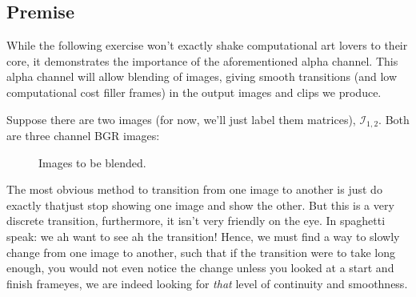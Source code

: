\documentclass[a4paper]{article}
\begin{document}
\subsection{Premise}
While the following exercise won't exactly shake computational art lovers to their core, it demonstrates the importance of the aforementioned alpha channel. This alpha channel will allow blending of images, giving smooth transitions (and low computational cost filler frames) in the output images and clips we produce.\\
\par\noindent Suppose there are two images (for now, we'll just label them matrices), $\mathcal{I}_{1,2}$. Both are three channel BGR images:
\begin{figure}[H]
  \centering
  \hspace{0.05\textwidth}
  \caption{Images to be blended.}
\end{figure}
The most obvious method to transition from one image to another is just do exactly that\textemdash just stop showing one image and show the other. But this is a very discrete transition, furthermore, it isn't very friendly on the eye. In spaghetti speak: we ah want to see ah the transition! Hence, we must find a way to slowly change from one image to another, such that if the transition were to take long enough, you would not even notice the change unless you looked at a start and finish frame\textemdash yes, we are indeed looking for \textit{that} level of continuity and smoothness.
\end{document}
